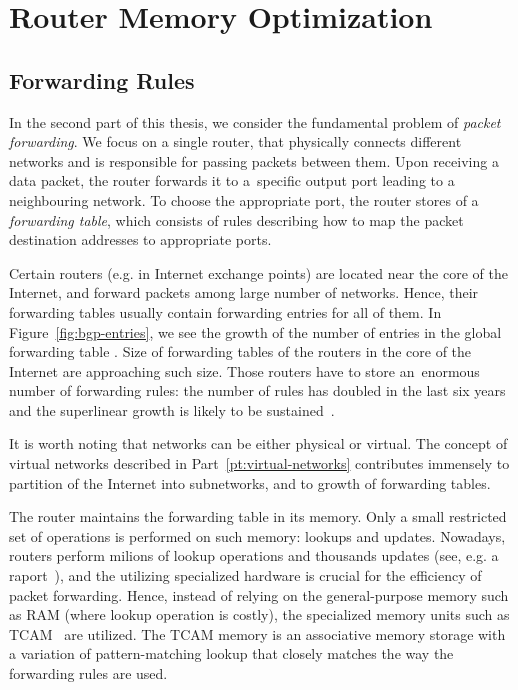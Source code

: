 \section{Router Memory Optimization}
\label{sec:intro-packet-forwarding}

\subsection{Forwarding Rules}

In the second part of this thesis, we consider the fundamental problem of \emph{packet forwarding}.
We focus on a single router, that physically connects different networks and is responsible for passing packets between them.
Upon receiving a data packet, the router forwards it to a~specific output port leading to a neighbouring network.
To choose the appropriate port, the router stores of a \emph{forwarding table}, which consists of rules describing how to map the packet destination addresses to appropriate ports.

Certain routers (e.g. in Internet exchange points) are located near the core of the Internet, and forward packets among large number of networks.
Hence, their forwarding tables usually contain forwarding entries for all of them.
In Figure~\ref{fig:bgp-entries}, we see the growth of the number of entries in the global forwarding table \cite{url-bgp-entries}.
Size of forwarding tables of the routers in the core of the Internet are approaching such size.
Those routers have to store an~enormous number of forwarding rules: the
number of rules has doubled in the last six years~\cite{bgp-routeviews} and
the superlinear growth is likely to be sustained~\cite{steve-myth}.

It is worth noting that networks can be either physical or virtual.
The concept of virtual networks described in Part~\ref{pt:virtual-networks} contributes immensely to partition of the Internet into subnetworks, and to growth of forwarding tables.


The router maintains the forwarding table in its memory.
Only a small restricted set of operations is performed on such memory: lookups and updates.
Nowadays, routers perform milions of lookup operations and thousands updates (see, e.g. a raport~\cite{bgp-updates}), and the utilizing specialized hardware is crucial for the efficiency of packet forwarding.
Hence, instead of relying on the general-purpose memory such as RAM (where lookup operation is costly), the specialized memory units such as TCAM~\cite{tcam-memory} are utilized.
The TCAM memory is an associative memory storage with a variation of pattern-matching lookup that closely matches the way the forwarding rules are used.

